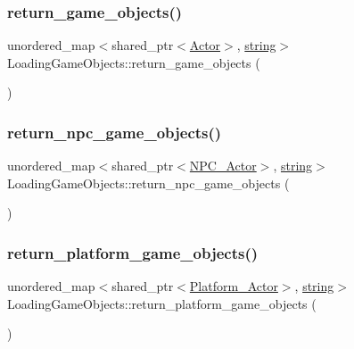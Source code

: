 \subsubsection{\texorpdfstring{return\+\_\+game\+\_\+objects()}{return\_game\_objects()}}
{\footnotesize\ttfamily unordered\+\_\+map$<$shared\+\_\+ptr$<$\hyperlink{classActor}{Actor}$>$, \hyperlink{imgui__impl__opengl3__loader_8h_ac83513893df92266f79a515488701770}{string}$>$ Loading\+Game\+Objects\+::return\+\_\+game\+\_\+objects (\begin{DoxyParamCaption}{ }\end{DoxyParamCaption})\hspace{0.3cm}{\ttfamily [inline]}}

\mbox{\label{classLoadingGameObjects_a867fe8c686aac5eaa7958df8f7b223c8}} 
\subsubsection{\texorpdfstring{return\+\_\+npc\+\_\+game\+\_\+objects()}{return\_npc\_game\_objects()}}
{\footnotesize\ttfamily unordered\+\_\+map$<$shared\+\_\+ptr$<$\hyperlink{classNPC__Actor}{N\+P\+C\+\_\+\+Actor}$>$, \hyperlink{imgui__impl__opengl3__loader_8h_ac83513893df92266f79a515488701770}{string}$>$ Loading\+Game\+Objects\+::return\+\_\+npc\+\_\+game\+\_\+objects (\begin{DoxyParamCaption}{ }\end{DoxyParamCaption})\hspace{0.3cm}{\ttfamily [inline]}}

\mbox{\label{classLoadingGameObjects_aab403109bbc6de5e4a1260da3f97d510}} 
\subsubsection{\texorpdfstring{return\+\_\+platform\+\_\+game\+\_\+objects()}{return\_platform\_game\_objects()}}
{\footnotesize\ttfamily unordered\+\_\+map$<$shared\+\_\+ptr$<$\hyperlink{classPlatform__Actor}{Platform\+\_\+\+Actor}$>$, \hyperlink{imgui__impl__opengl3__loader_8h_ac83513893df92266f79a515488701770}{string}$>$ Loading\+Game\+Objects\+::return\+\_\+platform\+\_\+game\+\_\+objects (\begin{DoxyParamCaption}{ }\end{DoxyParamCaption})\hspace{0.3cm}{\ttfamily [inline]}}

